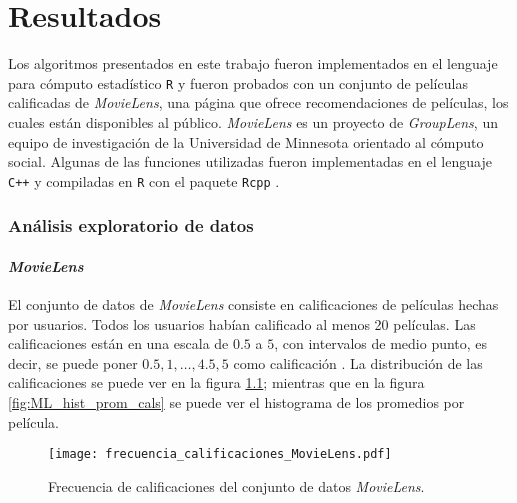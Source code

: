 
\chapter{Resultados}

Los algoritmos presentados en este trabajo fueron implementados en el lenguaje para cómputo estadístico \texttt{R} \cite{R_manual} y fueron probados con un conjunto de películas calificadas de \textit{MovieLens}, una página que ofrece recomendaciones de películas, los cuales están disponibles al público. \textit{MovieLens} es un proyecto de \textit{GroupLens}, un equipo de investigación de la Universidad de Minnesota orientado al cómputo social. Algunas de las funciones utilizadas fueron implementadas en el lenguaje \texttt{C++} y compiladas en \texttt{R} con el paquete \texttt{Rcpp} \cite{Rcpp_Book_Eddelbuettel} \cite{Rcpp_Article_Eddelbuettel_Francois}.

\subsection{Análisis exploratorio de datos}


\subsubsection{\textit{MovieLens}}

El conjunto de datos de \textit{MovieLens} consiste en  calificaciones de  películas hechas por  usuarios. Todos los usuarios habían calificado al menos 20 películas. Las calificaciones están en una escala de $0.5$ a $5$, con intervalos de medio punto, es decir, se puede poner $0.5, 1, \hdots, 4.5, 5$ como calificación \cite{harper2016movielens}. La distribución de las calificaciones se puede ver en la figura \ref{fig:ML_frec_calificaciones}; mientras que en la figura \ref{fig:ML_hist_prom_cals} se puede ver el histograma de los promedios por película.

\begin{figure}[H]
	\centering
 	\texttt{[image: frecuencia\_calificaciones\_MovieLens.pdf]}
 	\caption{Frecuencia de calificaciones del conjunto de datos \textit{MovieLens}.}
 	\label{fig:ML_frec_calificaciones}
\end{figure}

